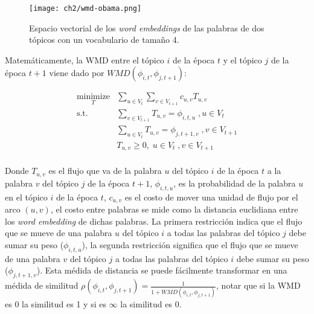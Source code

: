 \documentclass[letterpaper,12pt,oneside]{book} %
\begin{document}
\begin{figure}
    \centering
\texttt{[image: ch2/wmd-obama.png]}
    \caption{Espacio vectorial de los \textit{word embeddings} de las palabras de dos tópicos con un vocabulario de tamaño 4.}
    \label{img:wmd_obama}
\end{figure}

Matemáticamente, la WMD entre el tópico $i$ de la época $t$ y el tópico $j$ de la época $t+1$ viene dado por $WMD(\phi_{i,t}, \phi_{j,t+1})$:

\begin{align}
\underset{T}{\text{minimize}}&\sum_{u \in V_{t}}\sum_{v \in V_{t+1}} c_{u,v}T_{u,v} \\ 
\textrm{s.t.}\qquad &\sum_{v \in V_{t+1}}T_{u,v}= \phi_{i,t,u} \;, u \in V_{t}\\ 
& \sum_{u \in V_{t}}T_{u,v}= \phi_{j,t+1,v} \;, v\in V_{t+1}\\
& T_{u,v} \geq 0,\; u \in V_{t} \;, v \in V_{t+1}\\ \nonumber
\end{align}

Donde $T_{u,v}$ es el flujo que va de la palabra $u$ del tópico $i$ de la época $t$ a la palabra $v$ del tópico $j$ de la época $t+1$, $\phi_{i,t,u}$, es la probabilidad de la palabra $u$ en el tópico $i$ de la época $t$, $c_{u,v}$ es el costo de mover una unidad de flujo por el arco $(u,v)$, el costo entre palabras se mide como la distancia euclidiana entre los \textit{word embedding} de dichas palabras. La primera restricción indica que el flujo que se mueve de una palabra $u$ del tópico $i$ a todas las palabras del tópico $j$ debe sumar su peso ($\phi_{i,t,u}$), la segunda restricción significa que el flujo que se mueve de una palabra $v$ del tópico $j$ a todas las palabras del tópico $i$ debe sumar su peso ($\phi_{j,t+1,v}$). Esta médida de distancia se puede fácilmente transformar en una médida de similitud $\rho(\phi_{i,t}, \phi_{j,t+1}) = \frac{1}{1+WMD(\phi_{i,t}, \phi_{j,t+1})}$, notar que si la WMD es 0 la similitud es 1 y si es $\infty$ la similitud es 0. \\
\end{document}
